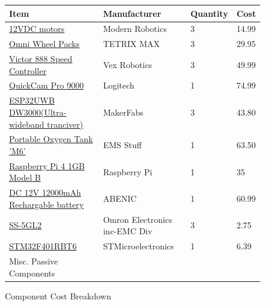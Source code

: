 \documentclass[journal,onecolumn, draftclsnofoot, 12pt]{IEEEtran}
\begin{document}
\begin{figure}[H]
\begin{center}
\begin{tabular}{ | m{10em} || m{10em} || m{10em} || m{5em} | } 
  \hline
  Item & Manufacturer & Quantity & Cost  \\ 
  \hline
  \hline
  \href{https://www.gobilda.com/modern-robotics-12vdc-motor/}{12VDC motors}
  &
  Modern Robotics
  &
  3
  &
  14.99
  \\
  \hline
  \href{https://www.pitsco.com/TETRIX-Omni-Wheel-Packs?SKU=}{Omni Wheel Packs}
  &
  TETRIX MAX
  &
  3
  &
  29.95
  \\
  \hline
  \href{https://www.team358.org/files/programming/ControlSystem2015-2019/specs/217-2769-Victor888UserManual.pdf}{Victor 888 Speed Controller}
  &
  Vex Robotics
  &
  3
  &
  49.99
  \\
  \hline
  \href{https://www.amazon.com/Logitech-Internet-Camera-2-0-Megapixel-Resolution/dp/B000RZQZM0}{QuickCam Pro 9000}
  &
  Logitech
  &
  1
  & 
  74.99
  \\
  \hline
  \href{https://www.makerfabs.com/esp32-uwb-dw3000.html}{ESP32UWB DW3000(Ultra-wideband tranciver)}
  &
  MakerFabs
  &
  3
  & 
  43.80
  \\
  \hline
  \href{https://www.emsstuff.com/portable-oxygen-tank-m6/}{Portable Oxygen Tank 'M6'}
  &
  EMS Stuff
  &
  1
  &
  63.50
  \\
  \hline
  \href{https://vilros.com/products/raspberry-pi-4-model-b}{Raspberry Pi 4 1GB Model B}
  &
  Raspberry Pi
  &
  1
  &
  35
  \\
  \hline
  \href{https://www.amazon.com/12000mAh-Rechargeable-Protable-Lithium-DC1212A/dp/B074P1YSWH}{DC 12V 12000mAh Rechargable battery}
  &
  ABENIC
  &
  1
  &
  60.99
  \\
  \hline
  \href{https://us.rs-online.com/product/omron-electronic-components/ss-5gl2/70176078/?gad_source=1&gclid=CjwKCAjwkuqvBhAQEiwA65XxQEdV2orcnIybOFSI0OQn9_tCmev5GoiAtupcvYr7Y0vKhSKmM4KsuxoCHLQQAvD_BwE&gclsrc=aw.ds}{SS-5GL2}
  &
  Omron Electronics inc-EMC Div
  &
  3
  &
  2.75
  \\
  \hline
  \href{https://estore.st.com/en/stm32f401rbt6-cpn.html}{STM32F401RBT6}
  &
  STMicroelectronics
  &
  1
  &
  6.39
  \\
  \hline
  Misc. Passive Components
  &
  &
  &
  \\
  \hline
  
 \end{tabular}
 \caption{ Component Cost Breakdown }
\label{fig:ComponentCost}
\end{center}

\end{figure}
\end{document}
